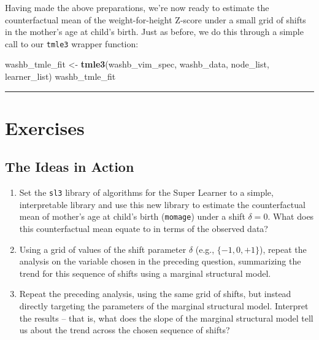 \documentclass[12pt, krantz2,]{book}
\newenvironment{Shaded}{\begin{snugshade}}{\end{snugshade}}
\newcommand{\KeywordTok}[1]{\textcolor[rgb]{0.13,0.29,0.53}{\textbf{#1}}}
\newcommand{\NormalTok}[1]{#1}
\newcommand{\StringTok}[1]{\textcolor[rgb]{0.31,0.60,0.02}{#1}}
\theoremstyle{definition}
\theoremstyle{definition}
\theoremstyle{definition}
\newcommand{\1}{\mathbbm{1}}
\begin{document}
Having made the above preparations, we're now ready to estimate the
counterfactual mean of the weight-for-height Z-score under a small grid of
shifts in the mother's age at child's birth. Just as before, we do this through
a simple call to our \texttt{tmle3} wrapper function:

\begin{Shaded}
\begin{Highlighting}[]
\NormalTok{washb_tmle_fit <-}\StringTok{ }\KeywordTok{tmle3}\NormalTok{(washb_vim_spec, washb_data, node_list, learner_list)}
\NormalTok{washb_tmle_fit}
\end{Highlighting}
\end{Shaded}

\begin{center}\rule{0.5\linewidth}{0.5pt}\end{center}

\hypertarget{exercises-3}{%
\section{Exercises}\label{exercises-3}}

\hypertarget{the-ideas-in-action-1}{%
\subsection{The Ideas in Action}\label{the-ideas-in-action-1}}

\begin{enumerate}
\def\labelenumi{\arabic{enumi}.}
\item
  Set the \texttt{sl3} library of algorithms for the Super Learner to a simple,
  interpretable library and use this new library to estimate the counterfactual
  mean of mother's age at child's birth (\texttt{momage}) under a shift \(\delta = 0\).
  What does this counterfactual mean equate to in terms of the observed data?
\item
  Using a grid of values of the shift parameter \(\delta\) (e.g., \(\{-1, 0, +1\}\)), repeat the analysis on the variable chosen in the preceding question,
  summarizing the trend for this sequence of shifts using a marginal structural
  model.
\item
  Repeat the preceding analysis, using the same grid of shifts, but instead
  directly targeting the parameters of the marginal structural model. Interpret
  the results -- that is, what does the slope of the marginal structural model
  tell us about the trend across the chosen sequence of shifts?
\end{enumerate}
\end{document}
